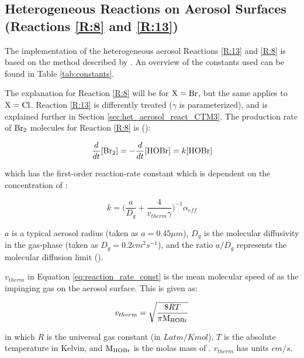 \subsection{Heterogeneous Reactions on Aerosol Surfaces (Reactions \ref{R:8} and \ref{R:13})}\label{sec:aerosol_react}

The implementation of the heterogeneous aerosol Reactions \ref{R:13} and \ref{R:8} is based on the method described by \cite{CAO}. An overview of the constants used can be found in Table \ref{tab:constants}.

\medskip

The explanation for Reaction \ref{R:8} will be for $\mathrm{X} = \mathrm{Br}$, but the same applies to $\mathrm{X} = \mathrm{Cl}$. Reaction \ref{R:13} is differently treated ($\gamma$ is parameterized), and is explained further in Section \ref{sec:het_aerosol_react_CTM3}. The production rate of $\mathrm{Br_2}$ molecules for Reaction \ref{R:8} is (\cite{schwartz1986}): 

\begin{equation*}
    \frac{d}{dt}[\mathrm{Br_2}] = -\frac{d}{dt}[\mathrm{HOBr}] = k[\mathrm{HOBr}]
\end{equation*}

which has the first-order reaction-rate constant which is dependent on the concentration of : 

\begin{equation}
    k = \big(\frac{a}{D_g} + \frac{4}{v_{therm}\gamma}\big)^{-1}\alpha_{eff}
    \label{eq:reaction_rate_const}
\end{equation}

$a$ is a typical aerosol radius (taken as $a = 0.45 \mu m$), $D_g$ is the molecular diffusivity in the gas-phase (taken as $D_g = 0.2  cm^2s^{-1}$), and the ratio $a/D_g$ represents the molecular diffusion limit (\cite{CAO}). 

\medskip

$v_{therm}$ in Equation \ref{eq:reaction_rate_const} is the mean molecular speed of  as the impinging gas on the aerosol surface. This is given as:

\begin{equation*}
    v_{therm} = \sqrt{\frac{8RT}{\pi \mathrm{M_{HOBr}}}}
\end{equation*}

in which $R$ is the universal gas constant (in $Latm/Kmol$), $T$ is the absolute temperature in Kelvin,  and $\mathrm{M_{HOBr}}$ is the molas mass of . $v_{therm}$ has units $cm/s$. 

